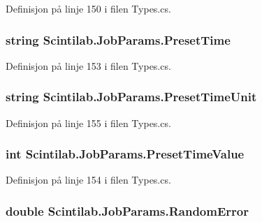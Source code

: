 Definisjon på linje 150 i filen Types.\+cs.

\hypertarget{class_scintilab_1_1_job_params_aa5fcccd640c3cd1907ce19ed2067b7dc}{
\subsubsection[{Preset\+Time}]{\setlength{\rightskip}{0pt plus 5cm}string Scintilab.\+Job\+Params.\+Preset\+Time}}\label{class_scintilab_1_1_job_params_aa5fcccd640c3cd1907ce19ed2067b7dc}


Definisjon på linje 153 i filen Types.\+cs.

\hypertarget{class_scintilab_1_1_job_params_ac4aa75b35ca6fccbb01cb6d6df6b2f15}{
\subsubsection[{Preset\+Time\+Unit}]{\setlength{\rightskip}{0pt plus 5cm}string Scintilab.\+Job\+Params.\+Preset\+Time\+Unit}}\label{class_scintilab_1_1_job_params_ac4aa75b35ca6fccbb01cb6d6df6b2f15}


Definisjon på linje 155 i filen Types.\+cs.

\hypertarget{class_scintilab_1_1_job_params_afeac9b178dfaa60b3e7c967ffaf3ae4e}{
\subsubsection[{Preset\+Time\+Value}]{\setlength{\rightskip}{0pt plus 5cm}int Scintilab.\+Job\+Params.\+Preset\+Time\+Value}}\label{class_scintilab_1_1_job_params_afeac9b178dfaa60b3e7c967ffaf3ae4e}


Definisjon på linje 154 i filen Types.\+cs.

\hypertarget{class_scintilab_1_1_job_params_a71eeddf0a3f7cc812456623ab1bb7700}{
\subsubsection[{Random\+Error}]{\setlength{\rightskip}{0pt plus 5cm}double Scintilab.\+Job\+Params.\+Random\+Error}}\label{class_scintilab_1_1_job_params_a71eeddf0a3f7cc812456623ab1bb7700}


